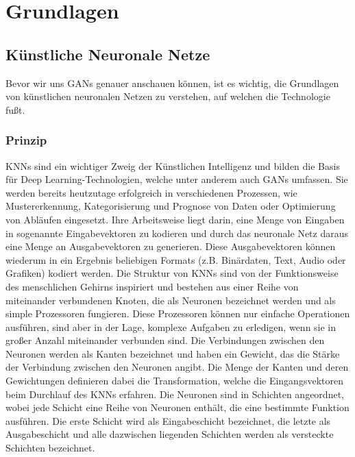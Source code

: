 \chapter{Grundlagen}

\section{Künstliche Neuronale Netze}

\noindent Bevor wir uns \acp{GAN} genauer anschauen können, ist es wichtig, die Grundlagen von künstlichen neuronalen Netzen zu verstehen, auf welchen die Technologie fußt.

\subsection{Prinzip}

\noindent \acp{KNN} sind ein wichtiger Zweig der Künstlichen Intelligenz und bilden die Basis für Deep Learning-Technologien, welche unter anderem auch GANs umfassen. Sie werden bereits heutzutage erfolgreich in verschiedenen Prozessen, wie Mustererkennung, Kategorisierung und Prognose von Daten oder Optimierung von Abläufen eingesetzt. Ihre Arbeitsweise liegt darin, eine Menge von Eingaben in sogenannte Eingabevektoren zu kodieren und durch das neuronale Netz daraus eine Menge an Ausgabevektoren zu generieren. Diese Ausgabevektoren können wiederum in ein Ergebnis beliebigen Formats (z.B. Binärdaten, Text, Audio oder Grafiken) kodiert werden. Die Struktur von \acp{KNN} sind von der Funktionsweise des menschlichen Gehirns inspiriert und bestehen aus einer Reihe von miteinander verbundenen Knoten, die als Neuronen bezeichnet werden und als simple Prozessoren fungieren. Diese Prozessoren können nur einfache Operationen ausführen, sind aber in der Lage, komplexe Aufgaben zu erledigen, wenn sie in großer Anzahl miteinander verbunden sind. Die Verbindungen zwischen den Neuronen werden als Kanten bezeichnet und haben ein Gewicht, das die Stärke der Verbindung zwischen den Neuronen angibt. Die Menge der Kanten und deren Gewichtungen definieren dabei die Transformation, welche die Eingangsvektoren beim Durchlauf des \ac{KNN}s erfahren. Die Neuronen sind in Schichten angeordnet, wobei jede Schicht eine Reihe von Neuronen enthält, die eine bestimmte Funktion ausführen. Die erste Schicht wird als Eingabeschicht bezeichnet, die letzte als Ausgabeschicht und alle dazwischen liegenden Schichten werden als versteckte Schichten bezeichnet.\cite{knnbook}\\

